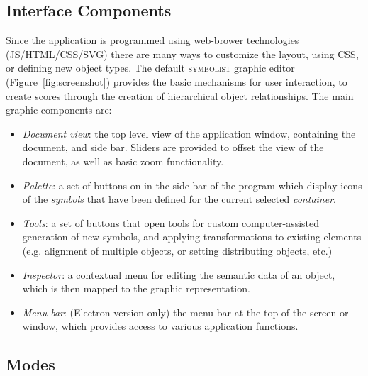 \documentclass{article}
\def\symbolist{\textsc{symbolist}\xspace}
\begin{document}

\subsection{Interface Components}\label{sec:interface_components}


Since the application is programmed using web-brower technologies (JS/HTML/CSS/SVG) there are many ways to customize the layout, using CSS, or defining new object types. 
The default \symbolist graphic editor (Figure~\ref{fig:screenshot}) provides the basic mechanisms for user interaction, to create scores through the creation of hierarchical object relationships.
The main graphic components are:

\begin{itemize}\itemsep0pt 
\item 
\textit{Document view}: the top level view of the application window, containing the document, and side bar. Sliders are provided to offset the view of the document, as well as basic zoom functionality.
\item 
\textit{Palette}: a set of buttons on in the side bar of the program which display icons of the \textit{symbols} that have been defined for the current selected \textit{container}. 
\item 
\textit{Tools}: a set of buttons that open tools for custom computer-assisted generation of new symbols, and applying transformations to existing elements (e.g. alignment of multiple objects, or setting distributing objects, etc.)
\item 
\textit{Inspector}: a contextual menu for editing the semantic data of an object, which is then mapped to the graphic representation.
\item 
\textit{Menu bar}: (Electron version only) the menu bar at the top of the screen or window, which provides access to various application functions.
\end{itemize}

\subsection{Modes}\label{sec:modes}
\end{document}
